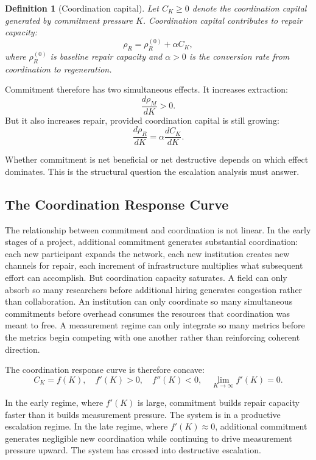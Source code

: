 \documentclass[12pt, a4paper]{article}
\theoremstyle{flyxion}
\newtheorem{definition}{Definition}
\newcommand{\rhoM}{\rho_{M}}
\newcommand{\rhoR}{\rho_{R}}
\begin{document}
\begin{definition}[Coordination capital]
Let $C_K \geq 0$ denote the coordination capital generated by commitment pressure $K$. Coordination capital contributes to repair capacity:
\[
  \rhoR = \rhoR^{(0)} + \alpha C_K,
\]
where $\rhoR^{(0)}$ is baseline repair capacity and $\alpha > 0$ is the conversion rate from coordination to regeneration.
\end{definition}

Commitment therefore has two simultaneous effects. It increases extraction:
\[
  \frac{d\rhoM}{dK} > 0.
\]
But it also increases repair, provided coordination capital is still growing:
\[
  \frac{d\rhoR}{dK} = \alpha \frac{dC_K}{dK}.
\]

Whether commitment is net beneficial or net destructive depends on which effect dominates. This is the structural question the escalation analysis must answer.

\subsection*{The Coordination Response Curve}

The relationship between commitment and coordination is not linear. In the early stages of a project, additional commitment generates substantial coordination: each new participant expands the network, each new institution creates new channels for repair, each increment of infrastructure multiplies what subsequent effort can accomplish. But coordination capacity saturates. A field can only absorb so many researchers before additional hiring generates congestion rather than collaboration. An institution can only coordinate so many simultaneous commitments before overhead consumes the resources that coordination was meant to free. A measurement regime can only integrate so many metrics before the metrics begin competing with one another rather than reinforcing coherent direction.

The coordination response curve is therefore concave:
\[
  C_K = f(K), \quad f'(K) > 0, \quad f''(K) < 0, \quad \lim_{K \to \infty} f'(K) = 0.
\]

In the early regime, where $f'(K)$ is large, commitment builds repair capacity faster than it builds measurement pressure. The system is in a productive escalation regime. In the late regime, where $f'(K) \approx 0$, additional commitment generates negligible new coordination while continuing to drive measurement pressure upward. The system has crossed into destructive escalation.
\end{document}
